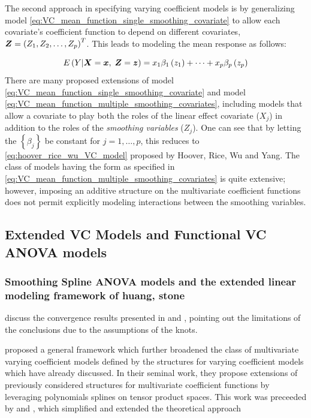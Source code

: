 \documentclass[12pt]{article}
\newcommand*\outlineskeleton{\color{green}}
\newcommand{\bfx}{\mbox{\boldmath $x$}}
\newcommand{\bfX}{\mbox{\boldmath $X$}}
\newcommand{\bfz}{\mbox{\boldmath $z$}}
\newcommand{\bfZ}{\mbox{\boldmath $Z$}}
\begin{document}
The second approach in specifying varying coefficient models is by generalizing model \ref{eq:VC_mean_function_single_smoothing_covariate} to allow each covariate's coefficient function to depend on different covariates, $\bfZ = \left(Z_1, Z_2, \dots, Z_p\right)^T$. This leads to modeling the mean response as follows:

\begin{equation} \label{eq:VC_mean_function_multiple_smoothing_covariates}
E\left(Y \vert \bfX=\bfx,\;\bfZ = \bfz \right) = x_1\beta_1\left(z_1\right) + \dots  + x_p\beta_p\left(z_p\right)
\end{equation}
\noindent
There are many proposed extensions of  model \ref{eq:VC_mean_function_single_smoothing_covariate} and model \ref{eq:VC_mean_function_multiple_smoothing_covariates}, including models that allow a covariate to play both the roles of the linear effect covariate ($X_j$) in addition to the roles of the \textit{smoothing variables} ($Z_j$). One can see that by letting the $\left\{  \beta_j \right\}$ be constant for $j=1, \dots, p$, this reduces to \ref{eq:hoover_rice_wu_VC_model} proposed by Hoover, Rice, Wu and Yang. The class of models having the form as specified in \ref{eq:VC_mean_function_multiple_smoothing_covariates} is quite extensive; however, imposing an additive structure on the multivariate coefficient functions does not permit explicitly modeling  interactions between the smoothing variables. 

\subsection{{\outlineskeleton Extended VC Models and Functional VC ANOVA models}} \label{extended_VC_models}
\subsubsection{{\outlineskeleton Smoothing Spline ANOVA models and the extended linear modeling framework of huang, stone}}

{\outlineskeleton discuss the convergence results presented in \cite{huang1998functional} and \cite{huang1998projection}, pointing out the limitations of the conclusions due to the assumptions of the knots. }

\cite{huang2003extended} proposed a general framework which further broadened the class of multivariate varying coefficient models defined by the structures for varying coefficient models which have already discussed. In their seminal work, they propose extensions of previously considered structures for multivariate coefficient functions by leveraging polynomials splines on tensor product spaces. This work was preceeded by \cite{huang1998projection} and \cite{huang1998projection}, which simplified and extended the theoretical approach 
\end{document}
